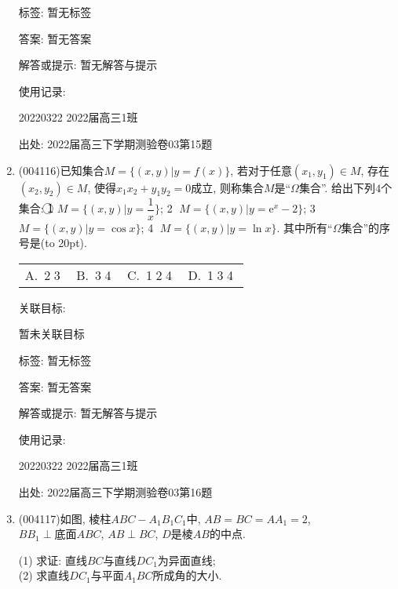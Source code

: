\documentclass[10pt,a4paper]{article}
\newcommand{\bracket}[1]{(\hbox to #1pt{})}
\newcommand{\fourch}[4]{\par\begin{tabular}{p{.23\textwidth}p{.23\textwidth}p{.23\textwidth}p{.23\textwidth}}
A.~#1 &B.~#2& C.~#3& D.~#4
\end{tabular}}
\begin{document}
\begin{enumerate}[1.]
标签: 暂无标签

答案: 暂无答案

解答或提示: 暂无解答与提示

使用记录:

20220322	2022届高三1班	


出处: 2022届高三下学期测验卷03第15题
\item { (004116)}已知集合$M=\{(x,y)|y=f(x)\}$, 若对于任意$(x_1,y_1)\in M$, 存在$(x_2,y_2)\in M$, 使得$x_1x_2+y_1y_2=0$成立, 则称集合$M$是``$\Omega$集合''. 给出下列$4$个集合:
\textcircled{1} $M=\{(x,y) |y=\dfrac 1x \}$; \textcircled{2} $M=\{(x,y)|y=\mathrm{e}^x-2\}$; \textcircled{3} $M=\{(x,y)|y=\cos x\}$; \textcircled{4} $M=\{(x,y)|y=\ln x\}$.
其中所有``$\Omega$集合''的序号是\bracket{20}.
\fourch{\textcircled{2}\textcircled{3}}{\textcircled{3}\textcircled{4}}{\textcircled{1}\textcircled{2}\textcircled{4}}{\textcircled{1}\textcircled{3}\textcircled{4}}


关联目标:

暂未关联目标



标签: 暂无标签

答案: 暂无答案

解答或提示: 暂无解答与提示

使用记录:

20220322	2022届高三1班	


出处: 2022届高三下学期测验卷03第16题
\item { (004117)}如图, 棱柱$ABC-A_1B_1C_1$中, $AB=BC=AA_1=2$, $BB_1\perp\text{底面}ABC$, $AB\perp BC$, $D$是棱$AB$的中点.
\begin{center}
\end{center}
(1) 求证: 直线$BC$与直线$DC_1$为异面直线;\\
(2) 求直线$DC_1$与平面$A_1BC$所成角的大小.



\end{enumerate}
\end{document}
